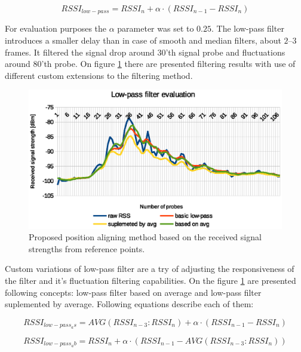 \documentclass[../main.tex]{subfiles}
\begin{document}
\begin{equation}
\label{eq:low-pass_filter}
	RSSI_{low-pass} = RSSI_{n} + \alpha \cdot (RSSI_{n-1} - RSSI_{n})
\end{equation}

For evaluation purposes the $\alpha$ parameter was set to $0.25$. The low-pass filter introduces a smaller delay than in case of smooth and median filters, about $2$--$3$ frames. It filtered the signal drop around $30$'th signal probe and fluctuations around $80$'th probe. On figure \ref{fig:filtering_low-pass} there are presented filtering results with use of different custom extensions to the filtering method.

\begin{figure}[!htbp]
\includegraphics[width=\textwidth]{pictures/filtering_low-pass}
\centering
\caption{Proposed position aligning method based on the received signal strengths from reference points.}
\label{fig:filtering_low-pass}
\end{figure}

Custom variations of low-pass filter are a try of adjusting the responsiveness of the filter and it's fluctuation filtering capabilities. On the figure \ref{fig:filtering_low-pass} are presented following concepts: low-pass filter based on average and low-pass filter suplemented by average. Following equations describe each of them:

\begin{equation}
\label{eq:low-pass_filter_avg_based}
	RSSI_{low-pass_as} = AVG(RSSI_{n-3}:RSSI_{n}) + \alpha \cdot (RSSI_{n-1} - RSSI_{n})
\end{equation}

\begin{equation}
\label{eq:low-pass_filter_avg_supplemented}
	RSSI_{low-pass_ab} = RSSI_{n} + \alpha \cdot (RSSI_{n-1} - AVG(RSSI_{n-3}:RSSI_{n}))
\end{equation}
\end{document}
